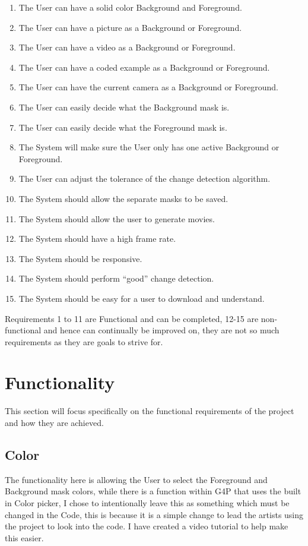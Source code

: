 \documentclass[a4paper]{report}
\begin{document}
\begin{enumerate}
\item The User can have a solid color Background and Foreground.
\item The User can have a picture as a Background or Foreground.
\item The User can have a video as a Background or Foreground.
\item The User can have a coded example as a Background or Foreground.
\item The User can have the current camera as a Background or Foreground.
\item The User can easily decide what the Background mask is.
\item The User can easily decide what the Foreground mask is.
\item The System will make sure the User only has one active Background or Foreground.
\item The User can adjust the tolerance of the change detection algorithm.
\item The System should allow the separate masks to be saved.
\item The System should allow the user to generate movies.
\item The System should have a high frame rate.
\item The System should be responsive.
\item The System should perform “good” change detection.
\item The System should be easy for a user to download and understand.
\end{enumerate}

Requirements 1 to 11 are Functional and can be completed, 12-15 are non-functional and hence can continually be improved on, they are not so much requirements as they are goals to strive for.

\section{Functionality}
This section will focus specifically on the functional requirements of the project and how they are achieved.

\subsection{Color}
The functionality here is allowing the User to select the Foreground and Background mask colors, while there is a function within G4P\cite{G4P} that uses the built in Color picker, I chose to intentionally leave this as something which must be changed in the Code, this is because it is a simple change to lead the artists using the project to look into the code. I have created a video tutorial to help make this easier.
\end{document}
